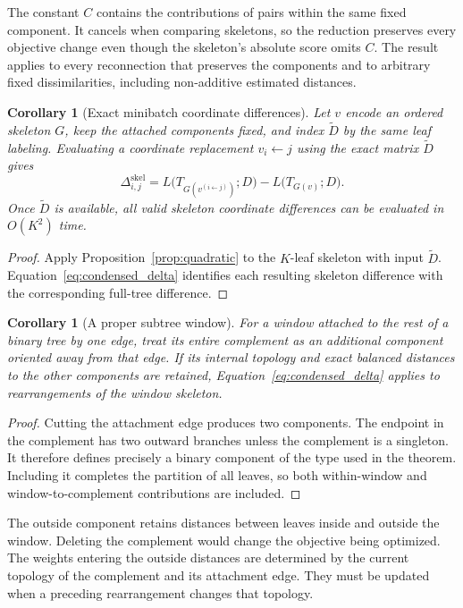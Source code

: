 \documentclass[11pt,a4paper]{article}
\makeatletter
\DeclareRobustCommand{\_}{\ifmmode\nfss@text{\textunderscore}\else\textunderscore\allowbreak\fi}
\newtheorem{corollary}[theorem]{Corollary}
\theoremstyle{definition}
\makeatother
\begin{document}
The constant $C$ contains the contributions of pairs within the same fixed component.
It cancels when comparing skeletons, so the reduction preserves every objective change even though the skeleton's absolute score omits $C$.
The result applies to every reconnection that preserves the components and to arbitrary fixed dissimilarities, including non-additive estimated distances.

\begin{corollary}[Exact minibatch coordinate differences]
\label{cor:minibatch_gradient}
Let $v$ encode an ordered skeleton $G$, keep the attached components fixed, and index $\widetilde D$ by the same leaf labeling.
Evaluating a coordinate replacement $v_i\leftarrow j$ using the exact matrix $\widetilde D$ gives
\begin{equation}
 \Delta^{\mathrm{skel}}_{i,j}
 =L\bigl(T_{G(v^{(i\leftarrow j)})};D\bigr)
  -L\bigl(T_{G(v)};D\bigr).
 \label{eq:minibatch_gradient}
\end{equation}
Once $\widetilde D$ is available, all valid skeleton coordinate differences can be evaluated in $O(K^2)$ time.
\end{corollary}
\begin{proof}
Apply Proposition~\ref{prop:quadratic} to the $K$-leaf skeleton with input $\widetilde D$.
Equation~\eqref{eq:condensed_delta} identifies each resulting skeleton difference with the corresponding full-tree difference.
\end{proof}

\begin{corollary}[A proper subtree window]
\label{cor:outside}
For a window attached to the rest of a binary tree by one edge, treat its entire complement as an additional component oriented away from that edge.
If its internal topology and exact balanced distances to the other components are retained, Equation~\eqref{eq:condensed_delta} applies to rearrangements of the window skeleton.
\end{corollary}
\begin{proof}
Cutting the attachment edge produces two components.
The endpoint in the complement has two outward branches unless the complement is a singleton.
It therefore defines precisely a binary component of the type used in the theorem.
Including it completes the partition of all leaves, so both within-window and window-to-complement contributions are included.
\end{proof}

The outside component retains distances between leaves inside and outside the window.
Deleting the complement would change the objective being optimized.
The weights entering the outside distances are determined by the current topology of the complement and its attachment edge.
They must be updated when a preceding rearrangement changes that topology.
\end{document}
